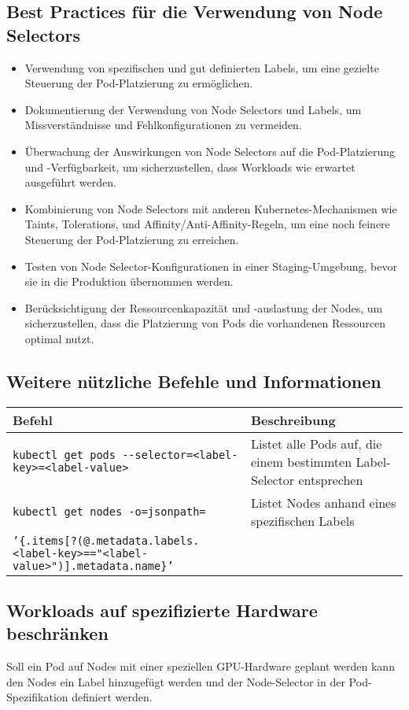 \subsection{Best Practices für die Verwendung von Node Selectors}
\begin{itemize}
    \item Verwendung von spezifischen und gut definierten Labels, um eine gezielte Steuerung der Pod-Platzierung zu ermöglichen.
    \item Dokumentierung der Verwendung von Node Selectors und Labels, um Missverständnisse und Fehlkonfigurationen zu vermeiden.
    \item Überwachung der Auswirkungen von Node Selectors auf die Pod-Platzierung und -Verfügbarkeit, um sicherzustellen, dass Workloads wie erwartet ausgeführt werden.
    \item Kombinierung von Node Selectors mit anderen Kubernetes-Mechanismen wie Taints, Tolerations, und Affinity/Anti-Affinity-Regeln, um eine noch feinere Steuerung der Pod-Platzierung zu erreichen.
    \item Testen von Node Selector-Konfigurationen in einer Staging-Umgebung, bevor sie in die Produktion übernommen werden.
    \item Berücksichtigung der Ressourcenkapazität und -auslastung der Nodes, um sicherzustellen, dass die Platzierung von Pods die vorhandenen Ressourcen optimal nutzt.
\end{itemize}

\subsection{Weitere nützliche Befehle und Informationen}
\begin{tabular}{|p{}|p{}|}
\hline
\textbf{Befehl} & \textbf{Beschreibung} \\
\hline
\texttt{kubectl get pods {-}{-}selector=<label-key>=<label-value>} & Listet alle Pods auf, die einem bestimmten Label-Selector entsprechen \\
\texttt{kubectl get nodes -o=jsonpath=} & Listet Nodes anhand eines spezifischen Labels \\
\texttt{'\{.items[?(@.metadata.labels.<label-key>=="<label-value>")].metadata.name\}'} &  \\
\hline
\end{tabular}


\subsection{Workloads auf spezifizierte Hardware beschränken}
Soll ein Pod auf Nodes mit einer speziellen GPU-Hardware geplant werden kann den Nodes ein Label hinzugefügt werden und der Node-Selector in der Pod-Spezifikation definiert werden.\\
